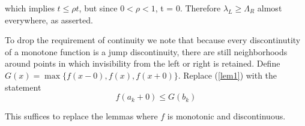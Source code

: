\documentclass[11pt]{article}
\begin{document}
\begin{enumerate}
which implies $t \leq \rho t$, but since $0 < \rho < 1$, t = 0.  Therefore $\lambda_L \geq \Lambda_R$ almost everywhere, as asserted.

To drop the requirement of continuity we note that because every discontinutity of a monotone function is a jump discontinuity, there are still neighborhoods around points in which invisibility from the left or right is retained.  Define $G(x) = \max\{f(x -0), f(x), f(x+0)\}$. Replace (\ref{lem1}) with the statement
\[
f(a_k + 0) \leq G(b_k)
\]

This suffices to replace the lemmas where $f$ is monotonic and discontinuous.

\end{enumerate}
\end{document}
